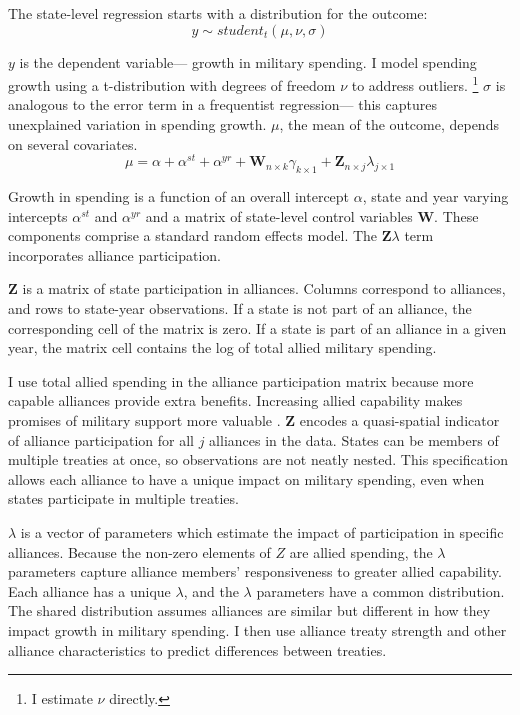 \documentclass[12pt]{article}
\begin{document}
The state-level regression starts with a distribution for the outcome:
\begin{equation}
y \sim student_t(\mu, \nu, \sigma)
\end{equation}
 

$y$ is the dependent variable--- growth in military spending. 
I model spending growth using a t-distribution with degrees of freedom $\nu$ to address outliers.
\footnote{I estimate $\nu$ directly.}
$\sigma$ is analogous to the error term in a frequentist regression--- this captures unexplained variation in spending growth.  
$\mu$, the mean of the outcome, depends on several covariates.
\begin{equation}
\mu = \alpha + \alpha^{st} + \alpha^{yr} +\textbf{W}_{n \times k} \gamma_{k \times 1}  + \textbf{Z}_{n \times j} \lambda_{j \times 1} 
\end{equation}


Growth in spending is a function of an overall intercept $\alpha$, state and year varying intercepts $\alpha^{st}$ and $\alpha^{yr}$ and a matrix of state-level control variables $\textbf{W}$.
These components comprise a standard random effects model. 
The $\textbf{Z} \lambda$ term incorporates alliance participation.


$\textbf{Z}$ is a matrix of state participation in alliances. 
Columns correspond to alliances, and rows to state-year observations. 
If a state is not part of an alliance, the corresponding cell of the matrix is zero.
If a state is part of an alliance in a given year, the matrix cell contains the log of total allied military spending.



I use total allied spending in the alliance participation matrix because more capable alliances provide extra benefits.
Increasing allied capability makes promises of military support more valuable \citep{Johnsonetal2015}.  
$\textbf{Z}$ encodes a quasi-spatial indicator of alliance participation for all $j$ alliances in the data. 
States can be members of multiple treaties at once, so observations are not neatly nested. 
This specification allows each alliance to have a unique impact on military spending, even when states participate in multiple treaties. 


$\lambda$ is a vector of parameters which estimate the impact of participation in specific alliances. 
Because the non-zero elements of $Z$ are allied spending, the $\lambda$ parameters capture alliance members' responsiveness to greater allied capability. 
Each alliance has a unique $\lambda$, and the $\lambda$ parameters have a common distribution. 
The shared distribution assumes alliances are similar but different in how they impact growth in military spending. 
I then use alliance treaty strength and other alliance characteristics to predict differences between treaties. 
\end{document}
